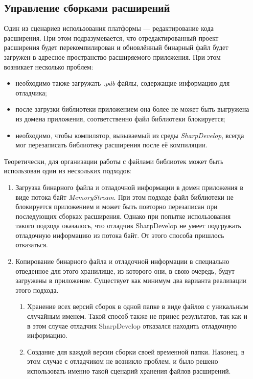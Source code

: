  
\subsection{Управление сборками расширений}
\label{sec:dll_manip}

Один из сценариев использования платформы --- редактирование кода расширения. При этом подразумевается, что отредактированный проект расширения будет перекомпилирован и обновлённый бинарный файл будет загружен в адресное пространство расширяемого приложения. При этом возникает несколько проблем:

\begin{itemize}
  \item необходимо также загружать {\it .pdb} файлы, содержащие информацию для отладчика;
  \item после загрузки библиотеки приложением она более не может быть выгружена из домена приложения, соответственно файл библиотеки блокируется;
  \item необходимо, чтобы компилятор, вызываемый из среды {\it SharpDevelop}, всегда мог перезаписать библиотеку расширения после её компиляции.
\end{itemize}

Теоретически, для организации работы с файлами библиотек может быть использован один из нескольких подходов:

\begin{enumerate}
  \item Загрузка бинарного файла и отладочной информации в домен приложения в виде потока байт {\it MemoryStream}.
  При этом подходе файл библиотеки не блокируется приложением и может быть повторно перезаписан при последующих сборках расширения. Однако при попытке использования такого подхода оказалось, что отладчик SharpDevelop не умеет подгружать отладочную информацию из потока байт. От этого способа пришлось отказаться.
  \item Копирование бинарного файла и отладочной информации в специально отведенное для этого хранилище, из которого они, в свою очередь, будут загружены в приложение.
  Существует как минимум два варианта реализации этого подхода.
  \begin{enumerate}
    \item Хранение всех версий сборок в одной папке в виде файлов с уникальным случайным именем. Такой способ также не принес результатов, так как и в этом случае отладчик SharpDevelop отказался находить отладочную информацию.
	\item Создание для каждой версии сборки своей временной папки. Наконец, в этом случае с отладчиком не возникло проблем, и было решено использовать именно такой сценарий хранения файлов расширений.
	\end{enumerate}
\end{enumerate}

